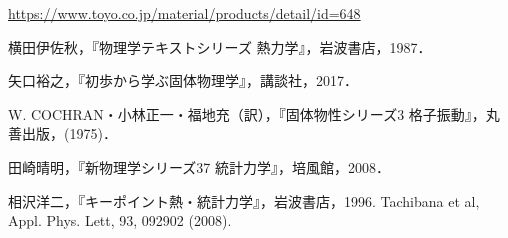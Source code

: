 \documentclass[10pt,b5paper,papersize,dvipdfmx]{jsbook}
\begin{document}
\begin{thebibliography}{99}
   \url{https://www.toyo.co.jp/material/products/detail/id=648}
  \item 横田伊佐秋，『物理学テキストシリーズ 熱力学』，岩波書店，1987．
  \item 矢口裕之，『初歩から学ぶ固体物理学』，講談社，2017．
  \item W. COCHRAN・小林正一・福地充（訳），『固体物性シリーズ3 格子振動』，丸善出版，(1975)．
  \item 田崎晴明，『新物理学シリーズ37 統計力学』，培風館，2008．
  \item 相沢洋二，『キーポイント熱・統計力学』，岩波書店，1996.
   Tachibana et al, Appl. Phys. Lett, 93, 092902 (2008).
\end{thebibliography}
\end{document}
